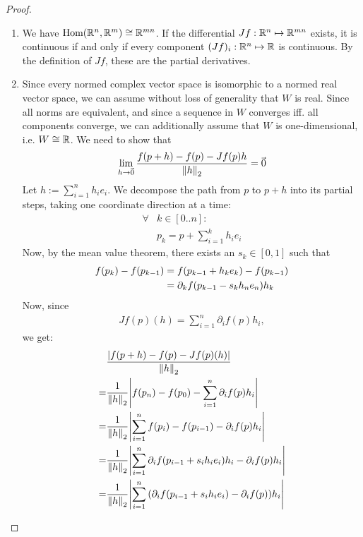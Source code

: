 \begin{proof}
	\begin{enumerate}
		\item[$\Rightarrow$:] We have $\textnormal{Hom}(\mathbb{R}^n, \mathbb{R}^m) \cong \mathbb{R}^{mn}$. If the differential $Jf : \mathbb{R}^n \mapsto \mathbb{R}^{mn}$ exists, it is continuous if and only if every component $(Jf)_i : \mathbb{R}^n \mapsto \mathbb{R}$ is continuous. By the definition of $Jf$, these are the partial derivatives.
		\item[$\Leftarrow$:]
		Since every normed complex vector space is isomorphic to a normed real vector space, we can assume without loss of generality that $W$ is real. Since all norms are equivalent, and since a sequence in $W$ converges iff. all components converge, we can additionally assume that $W$ is one-dimensional, i.e. $W \cong \mathbb{R}$.
		\newpar
		We need to show that
		\begin{align*}
			\lim_{h \to \kern-1.2pt\vec{\kern1.2pt 0}} \frac{f(p+h) - f(p) - Jf(p)h}{\norm{h}_2} = \kern-1.2pt\vec{\kern1.2pt 0}
		\end{align*}
		Let $h := \sum_{i = 1}^n h_ie_i$. We decompose the path from $p$ to $p+h$ into its partial steps, taking one coordinate direction at a time:
		\begin{align*}
			\forall &k \in [0..n]:\\
			&p_k = p + \sum_{i = 1}^k h_i e_i
		\end{align*}
		Now, by the mean value theorem, there exists an $s_k \in [0,1]$ such that
		\begin{align*}
			f(p_k) - f\qty(p_{k-1})
			&=
			f(p_{k-1} + h_ke_k) - f\qty(p_{k-1})\\
			&= \partial_k f(p_{k-1} - s_kh_ne_n)h_k
		\end{align*}
		Now, since 
		\begin{align*}
			Jf(p)(h) = \sum_{i = 1}^n \partial_i f(p)h_i,
		\end{align*}
		we get:
		\begin{align*}
			&\frac{\abs{f(p+h) - f(p) - Jf(p)(h)}}{\norm{h}_2}\\
			=
			&\frac{1}{\norm{h}_2}\abs{f(p_n) - f(p_0) - \sum_{i = 1}^n \partial_i f(p)h_i}\\
			=
			&\frac{1}{\norm{h}_2}
			\abs{\sum_{i = 1}^n f(p_i) - f(p_{i-1}) - \partial_i f(p) h_i}\\
			=
			&\frac{1}{\norm{h}_2}
			\abs{\sum_{i = 1}^n \partial_i f(p_{i-1} + s_ih_ie_i)h_i - \partial_i f(p) h_i}\\
			=
			&\frac{1}{\norm{h}_2}
			\abs{\sum_{i = 1}^n \lr(\partial_i f(p_{i-1} + s_ih_ie_i) - \partial_i f(p)) h_i}\\

\end{align*}
\end{enumerate}
\end{proof}
